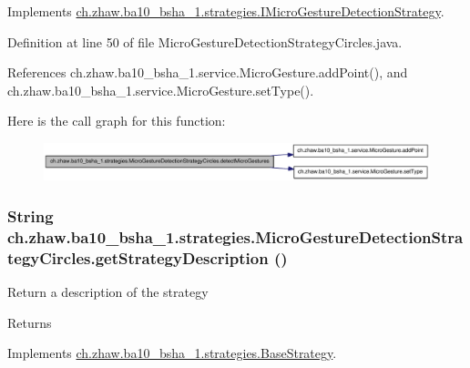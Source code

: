 Implements \hyperlink{interfacech_1_1zhaw_1_1ba10__bsha__1_1_1strategies_1_1IMicroGestureDetectionStrategy_a8593331fb67e5d4dc890d3db9f2d1b58}{ch.zhaw.ba10\_\-bsha\_\-1.strategies.IMicroGestureDetectionStrategy}.

Definition at line 50 of file MicroGestureDetectionStrategyCircles.java.

References ch.zhaw.ba10\_\-bsha\_\-1.service.MicroGesture.addPoint(), and ch.zhaw.ba10\_\-bsha\_\-1.service.MicroGesture.setType().

Here is the call graph for this function:\nopagebreak
\begin{figure}[H]
\begin{center}
\leavevmode
\includegraphics[width=376pt]{classch_1_1zhaw_1_1ba10__bsha__1_1_1strategies_1_1MicroGestureDetectionStrategyCircles_a1ce3987ae892eba2d0cf644a111933d3_cgraph}
\end{center}
\end{figure}
\hypertarget{classch_1_1zhaw_1_1ba10__bsha__1_1_1strategies_1_1MicroGestureDetectionStrategyCircles_af8c0c9ae9f2a172773c4a76833d2b687}{
\subsubsection[{getStrategyDescription}]{\setlength{\rightskip}{0pt plus 5cm}String ch.zhaw.ba10\_\-bsha\_\-1.strategies.MicroGestureDetectionStrategyCircles.getStrategyDescription ()}}
\label{classch_1_1zhaw_1_1ba10__bsha__1_1_1strategies_1_1MicroGestureDetectionStrategyCircles_af8c0c9ae9f2a172773c4a76833d2b687}
Return a description of the strategy

\begin{DoxyReturn}{Returns}

\end{DoxyReturn}


Implements \hyperlink{classch_1_1zhaw_1_1ba10__bsha__1_1_1strategies_1_1BaseStrategy_a75fdb36932ad701f6375cc1fe718056b}{ch.zhaw.ba10\_\-bsha\_\-1.strategies.BaseStrategy}.


